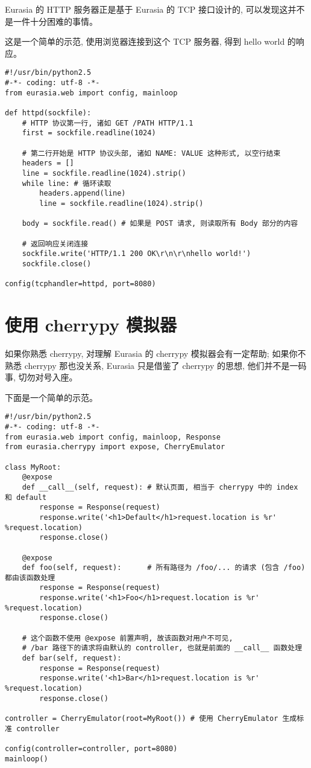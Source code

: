 \documentclass{manual}
\begin{document}
Eurasia 的 HTTP 服务器正是基于 Eurasia 的 TCP 接口设计的, 可以发现这并不是一件十分困难的事情。

这是一个简单的示范, 使用浏览器连接到这个 TCP 服务器, 得到 hello world 的响应。

\begin{verbatim}
#!/usr/bin/python2.5
#-*- coding: utf-8 -*-
from eurasia.web import config, mainloop

def httpd(sockfile):
	# HTTP 协议第一行, 诸如 GET /PATH HTTP/1.1
	first = sockfile.readline(1024)

	# 第二行开始是 HTTP 协议头部, 诸如 NAME: VALUE 这种形式, 以空行结束
	headers = []
	line = sockfile.readline(1024).strip()
	while line: # 循环读取
		headers.append(line)
		line = sockfile.readline(1024).strip()

	body = sockfile.read() # 如果是 POST 请求, 则读取所有 Body 部分的内容

	# 返回响应关闭连接
	sockfile.write('HTTP/1.1 200 OK\r\n\r\nhello world!')
	sockfile.close()

config(tcphandler=httpd, port=8080)
\end{verbatim}

\section{使用 cherrypy 模拟器}

如果你熟悉 cherrypy, 对理解 Eurasia 的 cherrypy 模拟器会有一定帮助; 如果你不熟悉 cherrypy 那也没关系, Eurasia 只是借鉴了 cherrypy 的思想, 他们并不是一码事, 切勿对号入座。

下面是一个简单的示范。

\begin{verbatim}
#!/usr/bin/python2.5
#-*- coding: utf-8 -*-
from eurasia.web import config, mainloop, Response
from eurasia.cherrypy import expose, CherryEmulator

class MyRoot:
	@expose
	def __call__(self, request): # 默认页面, 相当于 cherrypy 中的 index 和 default
		response = Response(request)
		response.write('<h1>Default</h1>request.location is %r' %request.location)
		response.close()

	@expose
	def foo(self, request):      # 所有路径为 /foo/... 的请求 (包含 /foo) 都由该函数处理
		response = Response(request)
		response.write('<h1>Foo</h1>request.location is %r' %request.location)
		response.close()

	# 这个函数不使用 @expose 前置声明, 故该函数对用户不可见,
	# /bar 路径下的请求将由默认的 controller, 也就是前面的 __call__ 函数处理
	def bar(self, request):
		response = Response(request)
		response.write('<h1>Bar</h1>request.location is %r' %request.location)
		response.close()

controller = CherryEmulator(root=MyRoot()) # 使用 CherryEmulator 生成标准 controller

config(controller=controller, port=8080)
mainloop()
\end{verbatim}
\end{document}

